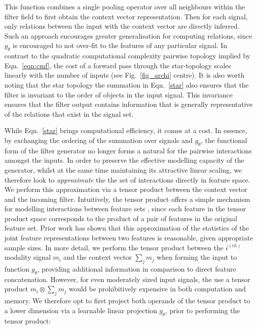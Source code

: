 This function combines a single pooling operator over all neighbours within the filter field to first obtain the context vector representation. Then for each signal, only relations between the input with the context vector are directly inferred. Such an approach encourages greater generalisation for computing relations, since $g_\theta$ is encouraged to not over-fit to the features of any particular signal. In contrast to the quadratic computational complexity pairwise topology implied by Eqn.~\ref{eqn:cmf}, the cost of a forward pass through the star-topology scales linearly with the number of inputs (see Fig.~\ref{fig_archi} centre). It is also worth noting that the star topology the summation in Eqn.~\ref{star} also ensures that the filter is invariant to the order of objects in the input signal. This invariance ensures that the filter output contains information that is generally representative of the relations that exist in the signal set.
 
While Eqn.~\ref{star} brings computational efficiency, it comes at a cost.  In essence, by exchanging the ordering of the summation over signals and $g_\theta$, the functional form of the filter generator no longer forms a natural for the pairwise interactions amongst the inputs.  In order to preserve the effective modelling capacity of the generator, whilst at the same time maintaining its attractive linear scaling, we therefore look to \textit{approximate} the the set of interactions directly in feature space.  We perform this approximation via a tensor product between the context vector and the incoming filter.  Intuitively, the tensor product offers a simple mechanism for  modelling interactions between feature sets \cite{long2017deep}, since each feature in the tensor product space corresponds to the product of a pair of features in the original feature set. Prior work has shown that this approximation of the statistics of the joint feature representations between two features \cite{song2013robust} is reasonable, given appropriate sample sizes. In more detail, we perform the tensor product between the $i^{(th)}$ modality signal $m_i$ and the context vector $\sum_{j} m_j$ when forming the input to function $g_\theta$, providing additional information in comparison to direct feature concatenation.  However, for even moderately sized input signals, the use a tensor product $m_i \otimes \sum_{j} m_j$ would be prohibitively expensive in both computation and memory.  We therefore opt to first project both operands of the tensor product to a lower dimension via a learnable linear projection $g_\theta$, prior to performing the tensor product:


